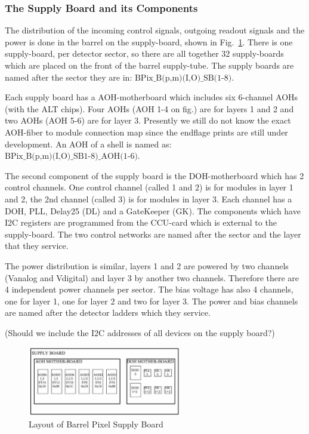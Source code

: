 \documentclass{cmspaper}
\begin{document}

\subsubsection{The Supply Board and its Components}
 
The distribution of the incoming control signals, outgoing 
readout signals and the power is done in the barrel 
on the supply-board, shown in Fig.~\ref{figure:supply_board}.  
There is one supply-board, per detector sector, so there are 
all together 32 supply-boards which are placed on the 
front of the barrel supply-tube. 
The supply boards are named after the sector they are in:
$\mbox{BPix\_B(p,m)(I,O)\_SB(1-8).}$
 
Each supply board has a AOH-motherboard which includes 
six 6-channel AOHs (with the ALT chips). Four AOHs
(AOH 1-4 on fig.) are for layers 1 and 2 and 
two AOHs (AOH 5-6) are for layer 3. 
Presently we still do not know the exact AOH-fiber to 
module connection map since the endflage prints are still 
under development.
An AOH of a shell is named as:
$\mbox{BPix\_B(p,m)(I,O)\_SB1-8)\_AOH(1-6).}$

The second component of the supply board is the 
DOH-motherboard which has 2 control channels.
One control channel (called 1 and 2) is for modules 
in layer 1 and 2, the 2nd channel (called 3) is 
for modules in layer 3. Each channel has a DOH, PLL,
Delay25 (DL) and a GateKeeper (GK). The components 
which have I2C registers are programmed from the CCU-card
which is external to the supply-board.
The two control networks are named after the sector and 
the layer that they service.

   
The power distribution is similar, layers 1 and 2 are powered 
by two channels (Vanalog and Vdigital) and layer 3 by 
another two channels. Therefore there are 4 independent 
power channels per sector. The bias voltage has also 
4 channels, one for layer 1, one for layer 2 and two
for layer 3. The power and bias channels are named 
after the detector ladders which they service.

(Should we include the I2C addresses of all devices on 
the supply board?)

\begin{figure}[hbtp] 
  \begin{center} 
        \includegraphics[width =0.6\textwidth]{supply_board.eps} 
    \caption{Layout of Barrel Pixel Supply Board} 
    \label{figure:supply_board} 
  \end{center} 
\end{figure} 
\end{document}
